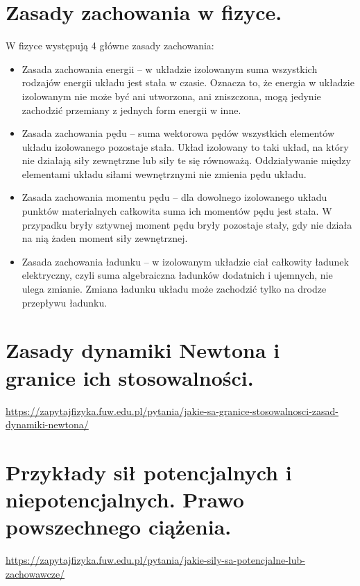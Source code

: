 \documentclass{article}
\begin{document}
\section{Zasady zachowania w fizyce.}
W fizyce występują 4 główne zasady zachowania:
\begin{itemize}
\item Zasada zachowania energii -- w układzie izolowanym suma wszystkich rodzajów energii układu jest stała w czasie. Oznacza to, że energia w układzie izolowanym nie może być ani utworzona, ani zniszczona, mogą jedynie zachodzić przemiany z jednych form energii w inne.
\item Zasada zachowania pędu -- suma wektorowa pędów wszystkich elementów układu  izolowanego pozostaje stała. Układ izolowany to taki układ, na który nie działają siły zewnętrzne lub siły te się równoważą. Oddziaływanie między elementami układu siłami wewnętrznymi nie zmienia pędu układu.
\item Zasada zachowania momentu pędu -- dla dowolnego izolowanego układu punktów materialnych całkowita suma ich momentów pędu jest stała. W przypadku bryły sztywnej moment pędu bryły pozostaje stały, gdy nie działa na nią żaden moment siły zewnętrznej.
\item Zasada zachowania ładunku -- w izolowanym układzie ciał całkowity ładunek elektryczny, czyli suma algebraiczna ładunków dodatnich i ujemnych, nie ulega zmianie. Zmiana ładunku układu może zachodzić tylko na drodze przepływu ładunku.
\end{itemize}
\section{Zasady dynamiki Newtona i granice ich stosowalności.}
\url{https://zapytajfizyka.fuw.edu.pl/pytania/jakie-sa-granice-stosowalnosci-zasad-dynamiki-newtona/}\\

\section{Przykłady sił potencjalnych i niepotencjalnych. Prawo powszechnego ciążenia.}
\url{https://zapytajfizyka.fuw.edu.pl/pytania/jakie-sily-sa-potencjalne-lub-zachowawcze/}
\end{document}

